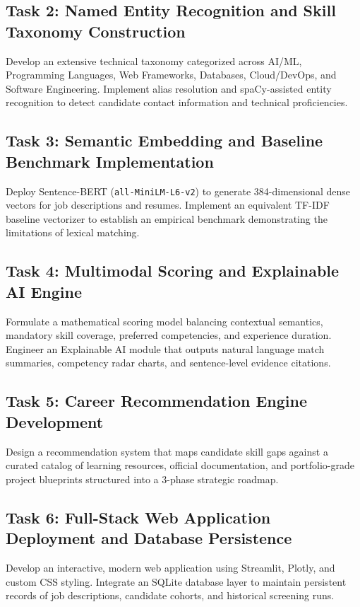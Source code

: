 \documentclass[12pt,a4paper]{report}
\begin{document}
\subsection{Task 2: Named Entity Recognition and Skill Taxonomy Construction}
Develop an extensive technical taxonomy categorized across AI/ML, Programming Languages, Web Frameworks, Databases, Cloud/DevOps, and Software Engineering. Implement alias resolution and spaCy-assisted entity recognition to detect candidate contact information and technical proficiencies.

\subsection{Task 3: Semantic Embedding and Baseline Benchmark Implementation}
Deploy Sentence-BERT (\texttt{all-MiniLM-L6-v2}) to generate 384-dimensional dense vectors for job descriptions and resumes. Implement an equivalent TF-IDF baseline vectorizer to establish an empirical benchmark demonstrating the limitations of lexical matching.

\subsection{Task 4: Multimodal Scoring and Explainable AI Engine}
Formulate a mathematical scoring model balancing contextual semantics, mandatory skill coverage, preferred competencies, and experience duration. Engineer an Explainable AI module that outputs natural language match summaries, competency radar charts, and sentence-level evidence citations.

\subsection{Task 5: Career Recommendation Engine Development}
Design a recommendation system that maps candidate skill gaps against a curated catalog of learning resources, official documentation, and portfolio-grade project blueprints structured into a 3-phase strategic roadmap.

\subsection{Task 6: Full-Stack Web Application Deployment and Database Persistence}
Develop an interactive, modern web application using Streamlit, Plotly, and custom CSS styling. Integrate an SQLite database layer to maintain persistent records of job descriptions, candidate cohorts, and historical screening runs.
\end{document}
